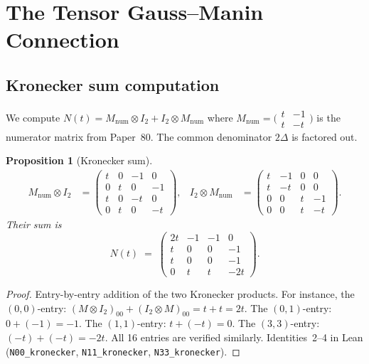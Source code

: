 \documentclass[11pt]{article}
\theoremstyle{plain}
\newtheorem{proposition}[theorem]{Proposition}
\theoremstyle{definition}
\theoremstyle{remark}
\begin{document}
\section{The Tensor Gauss--Manin Connection}\label{sec:tensor-conn}

\subsection{Kronecker sum computation}

We compute $N(t) = M_{\mathrm{num}} \otimes I_2 + I_2 \otimes M_{\mathrm{num}}$
where $M_{\mathrm{num}} = \bigl(\begin{smallmatrix} t & -1 \\ t & -t \end{smallmatrix}\bigr)$
is the numerator matrix from Paper~80.  The common denominator $2\Delta$ is factored out.

\begin{proposition}[Kronecker sum]\label{prop:kronecker}
\begin{align*}
M_{\mathrm{num}} \otimes I_2 &=
\begin{pmatrix}
t & 0 & -1 & 0 \\
0 & t & 0  & -1 \\
t & 0 & -t & 0 \\
0 & t & 0  & -t
\end{pmatrix},
&
I_2 \otimes M_{\mathrm{num}} &=
\begin{pmatrix}
t  & -1 & 0 & 0 \\
t  & -t & 0 & 0 \\
0  & 0  & t & -1 \\
0  & 0  & t & -t
\end{pmatrix}.
\end{align*}
Their sum is
\[
N(t) \;=\;
\begin{pmatrix}
2t & -1 & -1 & 0 \\
t  & 0  & 0  & -1 \\
t  & 0  & 0  & -1 \\
0  & t  & t  & -2t
\end{pmatrix}.
\]
\end{proposition}

\begin{proof}
Entry-by-entry addition of the two Kronecker products.  For instance,
the $(0,0)$-entry: $(M \otimes I_2)_{00} + (I_2 \otimes M)_{00} = t + t = 2t$.
The $(0,1)$-entry: $0 + (-1) = -1$.
The $(1,1)$-entry: $t + (-t) = 0$.
The $(3,3)$-entry: $(-t) + (-t) = -2t$.
All 16 entries are verified similarly.
Identities~2--4 in Lean (\texttt{N00\_kronecker},
\texttt{N11\_kronecker}, \texttt{N33\_kronecker}).
\end{proof}
\end{document}
